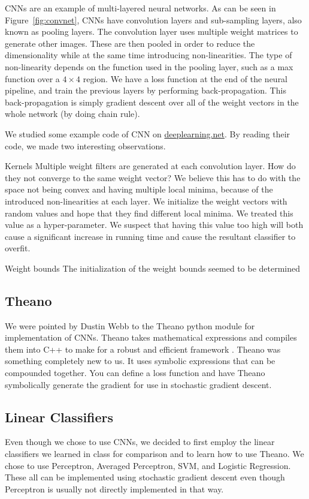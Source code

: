 CNNs are an example of multi-layered neural networks.  As can be seen in Figure~\ref{fig:convnet}, CNNs have convolution layers and sub-sampling layers, also known as pooling layers.  The convolution layer uses multiple weight matrices to generate other images.  These are then pooled in order to reduce the dimensionality while at the same time introducing non-linearities.  The type of non-linearity depends on the function used in the pooling layer, such as a max function over a $4 \times 4$ region.  We have a loss function at the end of the neural pipeline, and train the previous layers by performing back-propagation.  This back-propagation is simply gradient descent over all of the weight vectors in the whole network (by doing chain rule).

We studied some example code of CNN on \url{deeplearning.net}.   By reading their code, we made two interesting observations.
\begin{describe}
  \item[Kernels]
    Multiple weight filters are generated at each convolution layer.  How do they not converge to the same weight vector?  We believe this has to do with the space not being convex and having multiple local minima, because of the introduced non-linearities at each layer.  We initialize the weight vectors with random values and hope that they find different local minima.  We treated this value as a hyper-parameter.  We suspect that having this value too high will both cause a significant increase in running time and cause the resultant classifier to overfit.
  \item[Weight bounds]
    The initialization of the weight bounds seemed to be determined
\end{describe}

\subsection{Theano}

We were pointed by Dustin Webb to the Theano python module for implementation of CNNs.  Theano takes mathematical expressions and compiles them into C++ to make for a robust and efficient framework \cite{bergstra+al:2010-scipy}.  Theano was something completely new to us.  It uses symbolic expressions that can be compounded together.  You can define a loss function and have Theano symbolically generate the gradient for use in stochastic gradient descent.

\subsection{Linear Classifiers}

Even though we chose to use CNNs, we decided to first employ the linear classifiers we learned in class for comparison and to learn how to use Theano.  We chose to use Perceptron, Averaged Perceptron, SVM, and Logistic Regression.  These all can be implemented using stochastic gradient descent even though Perceptron is usually not directly implemented in that way.
